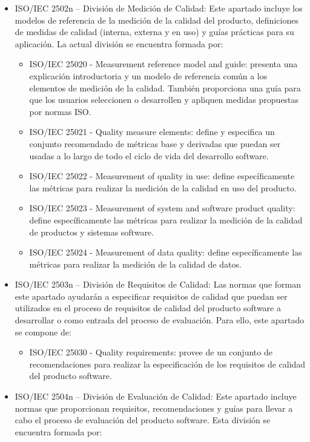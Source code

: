 \documentclass[preprint,12pt]{elsarticle}
\begin{document}
\begin{itemize}
		\item ISO/IEC 2502n – División de Medición de Calidad: Este apartado incluye los modelos de referencia de la medición de la calidad del producto, definiciones de medidas de calidad (interna, externa y en uso) y guías prácticas para su aplicación. La actual división se encuentra formada por:
		\begin{itemize}
			\item ISO/IEC 25020 - Measurement reference model and guide: presenta una explicación introductoria y un modelo de referencia común a los elementos de medición de la calidad. También proporciona una guía para que los usuarios seleccionen o desarrollen y apliquen medidas propuestas por normas ISO.
			\item ISO/IEC 25021 - Quality measure elements: define y especifica un conjunto recomendado de métricas base y derivadas que puedan ser usadas a lo largo de todo el ciclo de vida del desarrollo software.
			\item ISO/IEC 25022 - Measurement of quality in use: define específicamente las métricas para realizar la medición de la calidad en uso del producto.
			\item ISO/IEC 25023 - Measurement of system and software product quality: define específicamente las métricas para realizar la medición de la calidad de productos y sistemas software.
			\item ISO/IEC 25024 - Measurement of data quality: define específicamente las métricas para realizar la medición de la calidad de datos.
		\end{itemize}
		
		\item ISO/IEC 2503n – División de Requisitos de Calidad: Las normas que forman este apartado ayudarán a especificar requisitos de calidad que puedan ser utilizados en el proceso de requisitos de calidad del producto software a desarrollar o como entrada del proceso de evaluación. Para ello, este apartado se compone de:
		\begin{itemize}
			\item ISO/IEC 25030 - Quality requirements: provee de un conjunto de recomendaciones para realizar la especificación de los requisitos de calidad del producto software. 

		\end{itemize}
		
		
		\item ISO/IEC 2504n – División de Evaluación de Calidad: Este apartado incluye normas que proporcionan requisitos, recomendaciones y guías para llevar a cabo el proceso de evaluación del producto software. Esta división se encuentra formada por:


\end{itemize}
\end{document}
